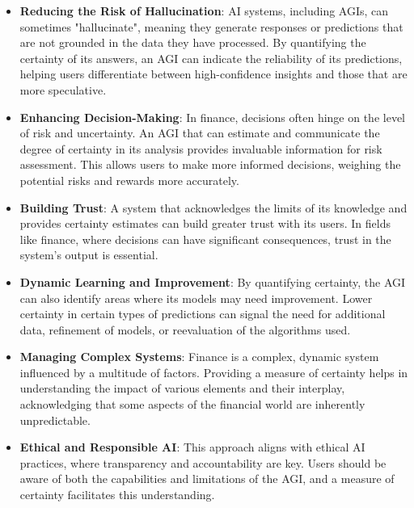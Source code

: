 \documentclass[11pt, reqno]{amsart}
\theoremstyle{definition}
\theoremstyle{remark}
\begin{document}
  \begin{itemize}
    \item \textbf{Reducing the Risk of Hallucination}: AI systems, including
      AGIs, can sometimes "hallucinate", meaning they generate responses or
      predictions that are not grounded in the data they have processed. By quantifying
      the certainty of its answers, an AGI can indicate the reliability of its
      predictions, helping users differentiate between high-confidence insights and
      those that are more speculative.

    \item \textbf{Enhancing Decision-Making}: In finance, decisions often hinge
      on the level of risk and uncertainty. An AGI that can estimate and communicate
      the degree of certainty in its analysis provides invaluable information for
      risk assessment. This allows users to make more informed decisions, weighing
      the potential risks and rewards more accurately.

    \item \textbf{Building Trust}: A system that acknowledges the limits of its knowledge
      and provides certainty estimates can build greater trust with its users.
      In fields like finance, where decisions can have significant consequences,
      trust in the system's output is essential.

    \item \textbf{Dynamic Learning and Improvement}: By quantifying certainty,
      the AGI can also identify areas where its models may need improvement. Lower
      certainty in certain types of predictions can signal the need for additional
      data, refinement of models, or reevaluation of the algorithms used.

    \item \textbf{Managing Complex Systems}: Finance is a complex, dynamic
      system influenced by a multitude of factors. Providing a measure of certainty
      helps in understanding the impact of various elements and their interplay,
      acknowledging that some aspects of the financial world are inherently
      unpredictable.

    \item \textbf{Ethical and Responsible AI}: This approach aligns with ethical
      AI practices, where transparency and accountability are key. Users should be
      aware of both the capabilities and limitations of the AGI, and a measure
      of certainty facilitates this understanding.
  \end{itemize}
\end{document}
